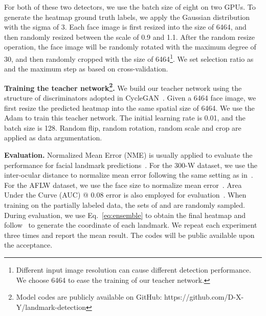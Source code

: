 \documentclass[10pt,twocolumn,letterpaper]{article}
\def\Eqref#1{{Eq.~\eqref{#1}}}
\begin{document}
For both of these two detectors, we use the batch size of eight on two GPUs.
To generate the heatmap ground truth labels, we apply the Gaussian distribution with the sigma of 3.
Each face image is first resized into the size of 6464, and then randomly resized between the scale of 0.9 and 1.1.
After the random resize operation, the face image will be randomly rotated with the maximum degree of 30, and then randomly cropped with the size of 6464\footnote{Different input image resolution can cause different detection performance. We choose 6464 to ease the training of our teacher network.}.
We set selection ratio  as  and the maximum step  as  based on cross-validation.



\textbf{Training the teacher network\footnote{Model codes are publicly available on GitHub: {https://github.com/D-X-Y/landmark-detection}}.}
We build our teacher network using the structure of discriminators adopted in CycleGAN~\cite{zhu2017unpaired}.
Given a 6464 face image, we first resize the predicted heatmap into the same spatial size of 6464.
We use the Adam to train this teacher network.
The initial learning rate is 0.01, and the batch size is 128.
Random flip, random rotation, random scale and crop are applied as data argumentation.


\textbf{Evaluation.}
Normalized Mean Error (NME) is usually applied to evaluate the performance for facial landmark predictions~\cite{lv2017deep,ren2016face,zhu2016unconstrained,dong2018san}.
For the 300-W dataset, we use the inter-ocular distance to normalize mean error following the same setting as in~\cite{sagonas2013300,lv2017deep,dong2018sbr,dong2018san}.
For the AFLW dataset, we use the face size to normalize mean error~\cite{lv2017deep}.
Area Under the Curve (AUC) @ 0.08 error is also employed for evaluation~\cite{bulat2017far,trigeorgis2016mnemonic}.
When training on the partially labeled data, the sets of  and  are randomly sampled.
During evaluation, we use \Eqref{eq:ensemble} to obtain the final heatmap and follow~\cite{wei2016convolutional,newell2016stacked} to generate the coordinate of each landmark.
We repeat each experiment three times and report the mean result.
The codes will be public available upon the acceptance.
\end{document}
